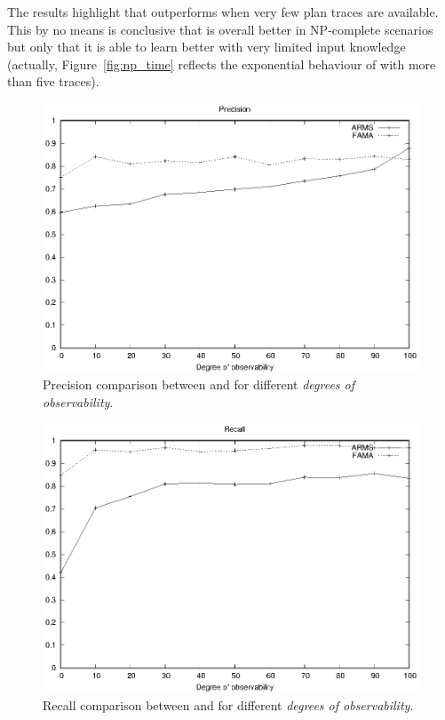The results highlight that \FAMA outperforms \ARMS when very few plan traces are available. This by no means is conclusive that \FAMA is overall better in NP-complete scenarios but only that it is able to learn better with very limited input knowledge (actually, Figure~\ref{fig:np_time} reflects the exponential behaviour of \FAMA with more than five traces).



\begin{figure}[hbt!]
	\centering
	\includegraphics[width=.65\linewidth]{figures/comparison_precision.eps}
	\caption{Precision comparison between \FAMA and \ARMS for different \emph{degrees of observability}.}
	\label{fig:comparison_precision}
\end{figure}

\begin{figure}[hbt!]
	\centering
	\includegraphics[width=.65\linewidth]{figures/comparison_recall.eps}
	\caption{Recall comparison between \FAMA and \ARMS for different \emph{degrees of observability}.}
	\label{fig:comparison_recall}
\end{figure}





